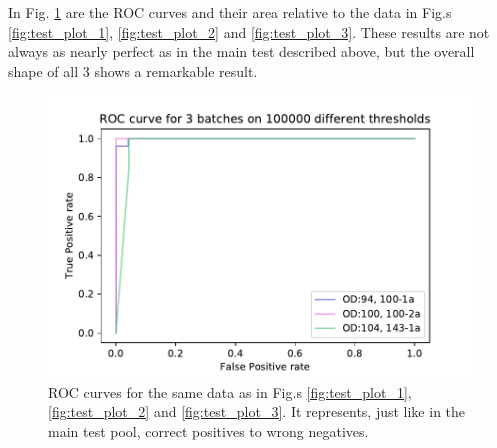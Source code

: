 \documentclass[12pt,a4paper,final]{book}			%
\begin{document}
				In Fig. \ref{fig:multi_roc} are the ROC curves and their area relative to the data in Fig.s \ref{fig:test_plot_1}, \ref{fig:test_plot_2} and \ref{fig:test_plot_3}. These results are not always as nearly perfect as in the main test described above, but the overall shape of all 3 shows a remarkable result. 				
				
				\begin{figure}[h!]
				\centering
					\includegraphics[scale=0.75]{figures/roc_best.pdf}
					\caption{ROC curves for the same data as in Fig.s \ref{fig:test_plot_1}, \ref{fig:test_plot_2} and \ref{fig:test_plot_3}. It represents, just like in the main test pool, correct positives to wrong negatives.}
					\label{fig:multi_roc}
				\end{figure}
%					
\end{document}
